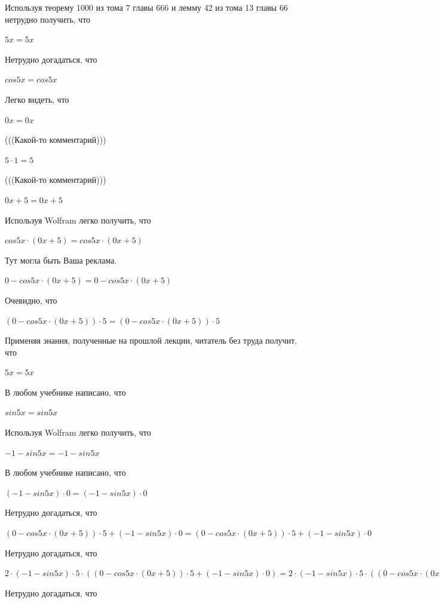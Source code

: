 \documentclass[12pt,a4paper,fleqn]{article}
\theoremstyle{definition}
\begin{document}
Используя теорему 1000 из тома 7 главы 666 и лемму 42 из тома 13 главы 66 нетрудно получить, что 

$ 5  x  =  5  x $

Нетрудно догадаться, что 

$cos 5  x  = cos 5  x $

Легко видеть, что 

$ 0  x  =  0  x $

(((Какой-то комментарий))) 

$ 5  \cdot  1  =  5 $

(((Какой-то комментарий))) 

$ 0  x  +  5  =  0  x  +  5 $

Используя Wolfram легко получить, что 

$cos 5  x  \cdot ( 0  x  +  5 ) = cos 5  x  \cdot ( 0  x  +  5 )$

Тут могла быть Ваша реклама. 

$ 0  - cos 5  x  \cdot ( 0  x  +  5 ) =  0  - cos 5  x  \cdot ( 0  x  +  5 )$

Очевидно, что 

$( 0  - cos 5  x  \cdot ( 0  x  +  5 )) \cdot  5  = ( 0  - cos 5  x  \cdot ( 0  x  +  5 )) \cdot  5 $

Применяя знания, полученные на прошлой лекции, читатель без труда получит, что 

$ 5  x  =  5  x $

В любом учебнике написано, что 

$sin 5  x  = sin 5  x $

Используя Wolfram легко получить, что 

$ -1  - sin 5  x  =  -1  - sin 5  x $

В любом учебнике написано, что 

$( -1  - sin 5  x ) \cdot  0  = ( -1  - sin 5  x ) \cdot  0 $

Нетрудно догадаться, что 

$( 0  - cos 5  x  \cdot ( 0  x  +  5 )) \cdot  5  + ( -1  - sin 5  x ) \cdot  0  = ( 0  - cos 5  x  \cdot ( 0  x  +  5 )) \cdot  5  + ( -1  - sin 5  x ) \cdot  0 $

Нетрудно догадаться, что 

$ 2  \cdot ( -1  - sin 5  x ) \cdot  5  \cdot (( 0  - cos 5  x  \cdot ( 0  x  +  5 )) \cdot  5  + ( -1  - sin 5  x ) \cdot  0 ) =  2  \cdot ( -1  - sin 5  x ) \cdot  5  \cdot (( 0  - cos 5  x  \cdot ( 0  x  +  5 )) \cdot  5  + ( -1  - sin 5  x ) \cdot  0 )$

Нетрудно догадаться, что 
\end{document}
